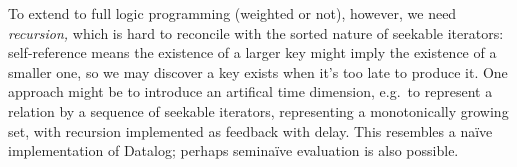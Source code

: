 \documentclass[acmsmall,screen,dvipsnames,svgnames]{acmart}
\begin{document}
To extend to full logic programming (weighted or not), however, we need \emph{recursion,} which is hard to reconcile with the sorted nature of seekable iterators: self-reference means the existence of a larger key might imply the existence of a smaller one, so we may discover a key exists when it's too late to produce it.
One approach might be to introduce an artifical time dimension, e.g.\ to represent a relation by a sequence of seekable iterators, representing a monotonically growing set, with recursion implemented as feedback with delay.
This resembles a na\"ive implementation of Datalog; perhaps semina\"ive evaluation is also possible.



\end{document}
